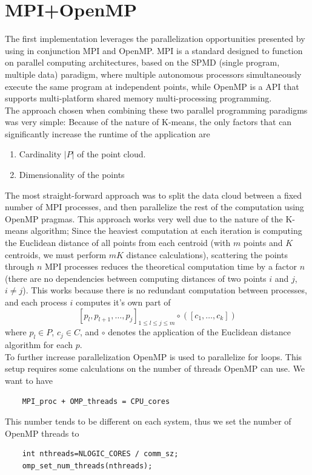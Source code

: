 \documentclass{article}
\begin{document}
\section*{MPI+OpenMP}
The first implementation leverages the parallelization opportunities presented by using in conjunction MPI and OpenMP. MPI is a standard designed to function on parallel computing architectures, based on the SPMD (single program, multiple data) paradigm, where multiple autonomous processors simultaneously execute the same program at independent points, while OpenMP is a API that supports multi-platform shared memory multi-processing programming. \\The approach chosen when combining these two parallel programming paradigms  was very simple: Because of the nature of K-means, the only factors that can significantly increase the runtime of the application are
\begin{enumerate}
    \item Cardinality $|P|$ of the point cloud.
    \item Dimensionality of the points
\end{enumerate}
The most straight-forward approach was to split the data cloud between a fixed number of MPI processes, and then parallelize the rest of the computation using OpenMP pragmas. This approach works very well due to the nature of the K-means algorithm; Since the heaviest computation at each iteration is computing the Euclidean distance of all points from each centroid (with $m$ points and $K$ centroids, we must perform $mK$ distance calculations), scattering the points through $n$ MPI processes reduces the theoretical computation time by a factor $n$ (there are no dependencies between computing distances of two points $i$ and $j$, $i\neq j$). This works because there is no redundant computation between processes, and each process $i$ computes it's own part of $$[p_l, p_{l+1}, \ldots, p_j]_{1\leq l \leq j \leq m} \circ([c_{1},\ldots,c_{k}])$$
where $p_l\in P$, $c_j \in C$, and $\circ$ denotes the application of the Euclidean distance algorithm for each $p$.\\ To further increase parallelization OpenMP is used to parallelize for loops. This setup requires some calculations on the number of threads OpenMP can use. We want to have 
\begin{lstlisting}
    MPI_proc + OMP_threads = CPU_cores
\end{lstlisting}
This number tends to be different on each system, thus we set the number of OpenMP threads to 
\begin{lstlisting}
    int nthreads=NLOGIC_CORES / comm_sz;
    omp_set_num_threads(nthreads);
\end{lstlisting}
\end{document}
